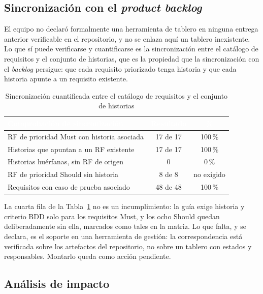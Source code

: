 \subsection{Sincronizaci\'on con el \emph{product backlog}}

El equipo no declar\'o formalmente una herramienta de tablero en ninguna entrega anterior verificable en el repositorio, y no se enlaza aqu\'i un tablero inexistente. Lo que s\'i puede verificarse y cuantificarse es la sincronizaci\'on entre el cat\'alogo de requisitos y el conjunto de historias, que es la propiedad que la sincronizaci\'on con el \emph{backlog} persigue: que cada requisito priorizado tenga historia y que cada historia apunte a un requisito existente.

\begin{table}[H]
\centering
\small
\begin{tabular}{|p{7.4cm}|c|c|}
\hline
\cellcolor{sigagreen}\textcolor{white}{\textbf{Comprobaci\'on de sincronizaci\'on}} & \cellcolor{sigagreen}\textcolor{white}{\textbf{Resultado}} & \cellcolor{sigagreen}\textcolor{white}{\textbf{\%}} \\ \hline
RF de prioridad Must con historia asociada & 17 de 17 & 100\,\% \\ \hline
Historias que apuntan a un RF existente & 17 de 17 & 100\,\% \\ \hline
Historias hu\'erfanas, sin RF de origen & 0 & 0\,\% \\ \hline
RF de prioridad Should sin historia & 8 de 8 & no exigido \\ \hline
Requisitos con caso de prueba asociado & 48 de 48 & 100\,\% \\ \hline
\end{tabular}
\caption{Sincronizaci\'on cuantificada entre el cat\'alogo de requisitos y el conjunto de historias}
\label{tab:sincronizacion}
\end{table}

La cuarta fila de la Tabla~\ref{tab:sincronizacion} no es un incumplimiento: la gu\'ia exige historia y criterio BDD solo para los requisitos Must, y los ocho Should quedan deliberadamente sin ella, marcados como tales en la matriz. Lo que falta, y se declara, es el soporte en una herramienta de gesti\'on: la correspondencia est\'a verificada sobre los artefactos del repositorio, no sobre un tablero con estados y responsables. Montarlo queda como acci\'on pendiente.

\subsection{An\'alisis de impacto}

